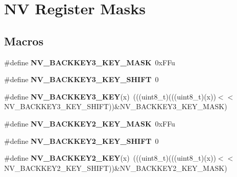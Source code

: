 \hypertarget{group___n_v___register___masks}{}\section{NV Register Masks}
\label{group___n_v___register___masks}
\subsection*{Macros}
\begin{DoxyCompactItemize}
\item 
\mbox{\label{group___n_v___register___masks_gabe9123bc8137627b30e4f75c757cfb95}} 
\#define {\bfseries N\+V\+\_\+\+B\+A\+C\+K\+K\+E\+Y3\+\_\+\+K\+E\+Y\+\_\+\+M\+A\+SK}~0x\+F\+Fu
\item 
\mbox{\label{group___n_v___register___masks_ga78b75e37d984596ddd9053d2125a78ff}} 
\#define {\bfseries N\+V\+\_\+\+B\+A\+C\+K\+K\+E\+Y3\+\_\+\+K\+E\+Y\+\_\+\+S\+H\+I\+FT}~0
\item 
\mbox{\label{group___n_v___register___masks_ga2fa5913563629cd7c8b509cc87421687}} 
\#define {\bfseries N\+V\+\_\+\+B\+A\+C\+K\+K\+E\+Y3\+\_\+\+K\+EY}(x)~(((uint8\+\_\+t)(((uint8\+\_\+t)(x))$<$$<$N\+V\+\_\+\+B\+A\+C\+K\+K\+E\+Y3\+\_\+\+K\+E\+Y\+\_\+\+S\+H\+I\+FT))\&N\+V\+\_\+\+B\+A\+C\+K\+K\+E\+Y3\+\_\+\+K\+E\+Y\+\_\+\+M\+A\+SK)
\item 
\mbox{\label{group___n_v___register___masks_ga5bf8822b0b59a321d9b5c30eb1618704}} 
\#define {\bfseries N\+V\+\_\+\+B\+A\+C\+K\+K\+E\+Y2\+\_\+\+K\+E\+Y\+\_\+\+M\+A\+SK}~0x\+F\+Fu
\item 
\mbox{\label{group___n_v___register___masks_ga408b1083508e784cba76d5be9b147a84}} 
\#define {\bfseries N\+V\+\_\+\+B\+A\+C\+K\+K\+E\+Y2\+\_\+\+K\+E\+Y\+\_\+\+S\+H\+I\+FT}~0
\item 
\mbox{\label{group___n_v___register___masks_gaca7b47cbaa596b76f92f926f40dcc80a}} 
\#define {\bfseries N\+V\+\_\+\+B\+A\+C\+K\+K\+E\+Y2\+\_\+\+K\+EY}(x)~(((uint8\+\_\+t)(((uint8\+\_\+t)(x))$<$$<$N\+V\+\_\+\+B\+A\+C\+K\+K\+E\+Y2\+\_\+\+K\+E\+Y\+\_\+\+S\+H\+I\+FT))\&N\+V\+\_\+\+B\+A\+C\+K\+K\+E\+Y2\+\_\+\+K\+E\+Y\+\_\+\+M\+A\+SK)

\end{DoxyCompactItemize}
